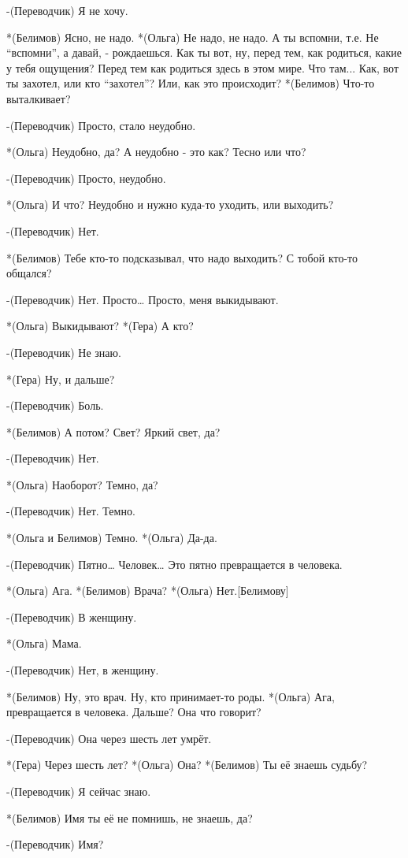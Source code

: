 -(Переводчик) Я не хочу.

*(Белимов) Ясно, не надо.
*(Ольга) Не надо, не надо. А ты вспомни, т.е. Не “вспомни”, а давай, - рождаешься. Как ты вот, ну, перед тем, как родиться, какие у тебя ощущения? Перед тем как родиться здесь в этом мире. Что там... Как, вот ты захотел, или кто “захотел”? Или, как это происходит?
*(Белимов) Что-то выталкивает?

-(Переводчик) Просто, стало неудобно.

*(Ольга) Неудобно, да? А неудобно - это как? Тесно или что?

-(Переводчик) Просто, неудобно.

*(Ольга) И что? Неудобно и нужно куда-то уходить, или выходить?

-(Переводчик) Нет.

*(Белимов) Тебе кто-то подсказывал, что надо выходить? С тобой кто-то общался?

-(Переводчик) Нет. Просто… Просто, меня выкидывают.

*(Ольга) Выкидывают?
*(Гера) А кто?

-(Переводчик) Не знаю.

*(Гера) Ну, и дальше?

-(Переводчик) Боль.

*(Белимов) А потом? Свет? Яркий свет, да?

-(Переводчик) Нет.

*(Ольга) Наоборот?  Темно, да?

-(Переводчик) Нет. Темно.

*(Ольга и Белимов) Темно.
*(Ольга) Да-да.

-(Переводчик) Пятно… Человек… Это пятно превращается в человека.

*(Ольга) Ага.
*(Белимов) Врача?
*(Ольга) Нет.[Белимову]

-(Переводчик) В женщину.

*(Ольга) Мама.

-(Переводчик) Нет, в женщину.

*(Белимов) Ну, это врач. Ну, кто принимает-то роды.
*(Ольга) Ага, превращается в человека. Дальше? Она что говорит?

-(Переводчик) Она через шесть лет умрёт.

*(Гера) Через шесть лет?
*(Ольга) Она?
*(Белимов) Ты её знаешь судьбу? 

-(Переводчик) Я сейчас знаю.

*(Белимов) Имя ты её не помнишь, не знаешь, да?

-(Переводчик) Имя?

